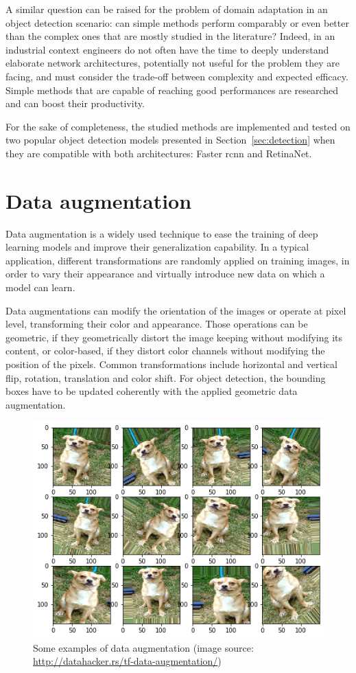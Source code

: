 \documentclass[%
    corpo=12pt,
    twoside,
    stile=classica,   
    tipotesi=magistrale,
    evenboxes,
    english,
	numerazioneromana,
]{toptesi}
\begin{document}
A similar question can be raised for the problem of domain adaptation in an object detection scenario: can simple methods perform comparably or even better than the complex ones that are mostly studied in the literature? Indeed, in an industrial context engineers do not often have the time to deeply understand elaborate network architectures, potentially not useful for the problem they are facing, and must consider the trade-off between complexity and expected efficacy. Simple methods that are capable of reaching good performances are researched and can boost their productivity.

For the sake of completeness, the studied methods are implemented and tested on two popular object detection models presented in Section~\ref{sec:detection} when they are compatible with both architectures: Faster \gls{rcnn} and RetinaNet.

\section{Data augmentation}\label{sec:dataaug}
Data augmentation is a widely used technique to ease the training of deep learning models and improve their generalization capability. In a typical application, different transformations are randomly applied on training images, in order to vary their appearance and virtually introduce new data on which a model can learn.

Data augmentations can modify the orientation of the images or operate at pixel level, transforming their color and appearance. Those operations can be geometric, if they geometrically distort the image keeping without modifying its content, or color-based, if they distort color channels without modifying the position of the pixels. Common transformations include horizontal and vertical flip, rotation, translation and color shift. For object detection, the bounding boxes have to be updated coherently with the applied geometric data augmentation.

\begin{figure}[ht!]
	\centering
	\includegraphics[width=0.7\linewidth]{imgs/augmentation.png}
	\caption{Some examples of data augmentation (image source: \url{http://datahacker.rs/tf-data-augmentation/})}
	\label{fig:augmentation}
\end{figure}
\end{document}
